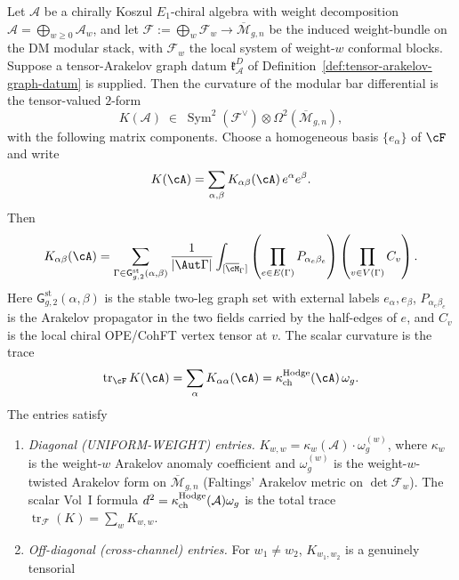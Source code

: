 \begin{theorem}
\label{thm:theoremD-tensor-arakelov}
Let $\mathcal{A}$ be a chirally Koszul $E_1$-chiral algebra with
weight decomposition $\mathcal{A} = \bigoplus_{w \ge 0}
\mathcal{A}_w$, and let
$\mathcal{F} := \bigoplus_w \mathcal{F}_w \to
\overline{\mathcal{M}}_{g,n}$ be the induced weight-bundle on the
DM modular stack, with $\mathcal{F}_w$ the local system of
weight-$w$ conformal blocks. Suppose a tensor-Arakelov graph datum
\(\mathfrak k_{\mathcal A}^{D}\) of
Definition~\ref{def:tensor-arakelov-graph-datum} is supplied.  Then
the curvature of the modular bar differential is the tensor-valued
\(2\)-form
\[
 K(\mathcal{A}) \;\in\;
 \operatorname{Sym}^2(\mathcal{F}^\vee)
 \otimes \Omega^2(\overline{\mathcal{M}}_{g,n}),
\]
with the following matrix components. Choose a homogeneous basis
$\{e_\alpha\}$ of $\cF$ and write
\[
 K(\cA)=\sum_{\alpha,\beta}K_{\alpha\beta}(\cA)\,e^\alpha e^\beta .
\]
Then
\begin{equation}\label{eq:tensor-arakelov-component-graph-integral}
 K_{\alpha\beta}(\cA)
 =
 \sum_{\Gamma\in\mathsf{G}^{\mathrm{st}}_{g,2}(\alpha,\beta)}
 \frac{1}{|\Aut\Gamma|}
 \int_{[\overline{\cM}_\Gamma]}
 \left(\prod_{e\in E(\Gamma)}P_{\alpha_e\beta_e}\right)
 \left(\prod_{v\in V(\Gamma)}C_v\right).
\end{equation}
Here $\mathsf{G}^{\mathrm{st}}_{g,2}(\alpha,\beta)$ is the stable
two-leg graph set with external labels $e_\alpha,e_\beta$,
$P_{\alpha_e\beta_e}$ is the Arakelov propagator in the two fields
carried by the half-edges of $e$, and $C_v$ is the local chiral
OPE/CohFT vertex tensor at $v$. The scalar curvature is the trace
\[
 \operatorname{tr}_{\cF}K(\cA)
 =
 \sum_\alpha K_{\alpha\alpha}(\cA)
 =
 \kappaChHodge(\cA)\,\omega_g.
\]
The entries satisfy
\begin{enumerate}
\item\label{td-i} \emph{Diagonal (UNIFORM-WEIGHT) entries.}
 $K_{w,w} = \kappa_w(\mathcal{A}) \cdot \omega_g^{(w)}$, where
 $\kappa_w$ is the weight-$w$ Arakelov anomaly coefficient and
 $\omega_g^{(w)}$ is the weight-$w$-twisted Arakelov form on
 $\overline{\mathcal{M}}_{g,n}$ (Faltings' Arakelov metric on
 $\det \mathcal{F}_w$). The scalar Vol~I formula
 $d^2=\kappa_{\mathrm{ch}}^{\mathrm{Hodge}}(\mathcal A)\omega_g$ is the total trace
 $\operatorname{tr}_\mathcal{F}(K) = \sum_w K_{w,w}$.
\item\label{td-ii} \emph{Off-diagonal (cross-channel) entries.}
 For $w_1 \ne w_2$, $K_{w_1,w_2}$ is a genuinely tensorial

\end{enumerate}
\end{theorem}
